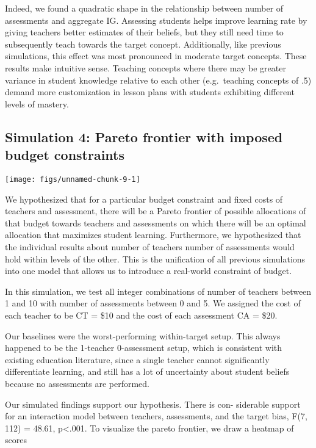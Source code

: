 \documentclass[man]{apa6}
\newenvironment{CodeChunk}{}{}
\begin{document}
Indeed, we found a quadratic shape in the relationship between number of
assessments and aggregate IG. Assessing students helps improve learning
rate by giving teachers better estimates of their beliefs, but they
still need time to subsequently teach towards the target concept.
Additionally, like previous simulations, this effect was most pronounced
in moderate target concepts. These results make intuitive sense.
Teaching concepts where there may be greater variance in student
knowledge relative to each other (e.g.~teaching concepts of .5) demand
more customization in lesson plans with students exhibiting different
levels of mastery.

\subsection{Simulation 4: Pareto frontier with imposed budget
constraints}\label{simulation-4-pareto-frontier-with-imposed-budget-constraints}

\begin{CodeChunk}

\texttt{[image: figs/unnamed-chunk-9-1]} \end{CodeChunk}

We hypothesized that for a particular budget constraint and fixed costs
of teachers and assessment, there will be a Pareto frontier of possible
allocations of that budget towards teachers and assessments on which
there will be an optimal allocation that maximizes student learning.
Furthermore, we hypothesized that the individual results about number of
teachers number of assessments would hold within levels of the other.
This is the unification of all previous simulations into one model that
allows us to introduce a real-world constraint of budget.

In this simulation, we test all integer combinations of number of
teachers between 1 and 10 with number of assessments between 0 and 5. We
assigned the cost of each teacher to be CT = \$10 and the cost of each
assessment CA = \$20.

Our baselines were the worst-performing within-target setup. This always
happened to be the 1-teacher 0-assessment setup, which is consistent
with existing education literature, since a single teacher cannot
significantly differentiate learning, and still has a lot of uncertainty
about student beliefs because no assessments are performed.

Our simulated findings support our hypothesis. There is con- siderable
support for an interaction model between teachers, assessments, and the
target bias, F(7, 112) = 48.61, p\textless{}.001. To visualize the
pareto frontier, we draw a heatmap of scores
\end{document}
